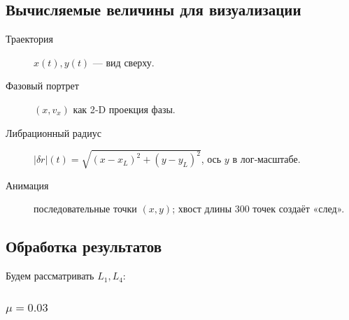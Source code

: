 \documentclass[12pt]{article}
\begin{document}
\subsection{Вычисляемые величины для визуализации}

\begin{description}
  \item[Траектория] $x(t),y(t)$ — вид сверху.
  \item[Фазовый портрет] $(x,v_x)$ как 2‑D проекция фазы.
  \item[Либрационный радиус] $|\delta r|(t)
    =\sqrt{(x-x_L)^2+(y-y_L)^2}$, ось $y$ в лог‑масштабе.
  \item[Анимация] последовательные точки $(x,y)$;
        хвост длины 300 точек создаёт «след».
\end{description}

\subsection{Обработка результатов}

Будем рассматривать $L_1,L_4$:

\subsubsection{$\mu=0.03$}
\end{document}
